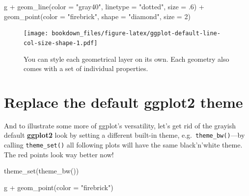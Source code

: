 \documentclass[
]{krantz}
\makeatletter
\newenvironment{Shaded}{\begin{snugshade}}{\end{snugshade}}
\newcommand{\AttributeTok}[1]{\textcolor[rgb]{0.61,0.61,0.61}{#1}}
\newcommand{\DecValTok}[1]{\textcolor[rgb]{0.06,0.06,0.06}{#1}}
\newcommand{\FunctionTok}[1]{\textcolor[rgb]{0,0,0}{#1}}
\newcommand{\NormalTok}[1]{#1}
\newcommand{\SpecialCharTok}[1]{\textcolor[rgb]{0,0,0}{#1}}
\newcommand{\StringTok}[1]{\textcolor[rgb]{0.5,0.5,0.5}{#1}}
\newenvironment{kframe}{%
\medskip{}
\setlength{\fboxsep}{.8em}
 \def\at@end@of@kframe{}%
 \ifinner\ifhmode%
  \def\at@end@of@kframe{\end{minipage}}%
  \begin{minipage}{\columnwidth}%
 \fi\fi%
 \def\FrameCommand##1{\hskip\@totalleftmargin \hskip-\fboxsep
 \colorbox{shadecolor}{##1}\hskip-\fboxsep
     \hskip-\linewidth \hskip-\@totalleftmargin \hskip\columnwidth}%
 \MakeFramed {\advance\hsize-\width
   \@totalleftmargin\z@ \linewidth\hsize
   \@setminipage}}%
 {\par\unskip\endMakeFramed%
 \at@end@of@kframe}
\renewenvironment{Shaded}{\begin{kframe}}{\end{kframe}}
\makeatother
\begin{document}
\begin{Shaded}
\begin{Highlighting}[]
\NormalTok{g }\SpecialCharTok{+} \FunctionTok{geom\_line}\NormalTok{(}\AttributeTok{color =} \StringTok{"gray40"}\NormalTok{, }\AttributeTok{linetype =} \StringTok{"dotted"}\NormalTok{, }\AttributeTok{size =}\NormalTok{ .}\DecValTok{6}\NormalTok{) }\SpecialCharTok{+} 
   \FunctionTok{geom\_point}\NormalTok{(}\AttributeTok{color =} \StringTok{"firebrick"}\NormalTok{, }\AttributeTok{shape =} \StringTok{"diamond"}\NormalTok{, }\AttributeTok{size =} \DecValTok{2}\NormalTok{)}
\end{Highlighting}
\end{Shaded}

\begin{figure}
\centering
\texttt{[image: bookdown\_files/figure-latex/ggplot-default-line-col-size-shape-1.pdf]}
\caption{\label{fig:ggplot-default-line-col-size-shape}You can style each geometrical layer on its own. Each geometry also comes with a set of individual properties.}
\end{figure}

\hypertarget{theme}{%
\section{\texorpdfstring{Replace the default \textbf{ggplot2} theme}{Replace the default ggplot2 theme}}\label{theme}}

And to illustrate some more of ggplot's versatility, let's get rid of the grayish default \textbf{ggplot2} look by setting a different built-in theme, e.g.~\texttt{theme\_bw()}---by calling \texttt{theme\_set()} all following plots will have the same black'n'white theme. The red points look way better now!

\begin{Shaded}
\begin{Highlighting}[]
\FunctionTok{theme\_set}\NormalTok{(}\FunctionTok{theme\_bw}\NormalTok{())}

\NormalTok{g }\SpecialCharTok{+} \FunctionTok{geom\_point}\NormalTok{(}\AttributeTok{color =} \StringTok{"firebrick"}\NormalTok{)}
\end{Highlighting}
\end{Shaded}
\end{document}
